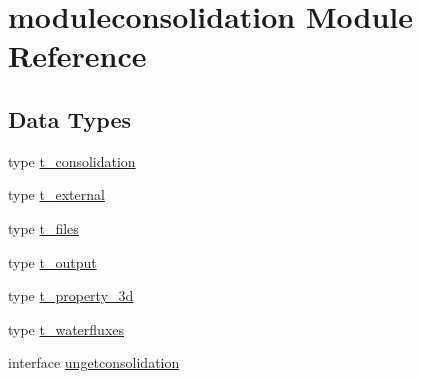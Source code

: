 \hypertarget{namespacemoduleconsolidation}{}\section{moduleconsolidation Module Reference}
\label{namespacemoduleconsolidation}
\subsection*{Data Types}
\begin{DoxyCompactItemize}
\item 
type \mbox{\hyperlink{structmoduleconsolidation_1_1t__consolidation}{t\+\_\+consolidation}}
\item 
type \mbox{\hyperlink{structmoduleconsolidation_1_1t__external}{t\+\_\+external}}
\item 
type \mbox{\hyperlink{structmoduleconsolidation_1_1t__files}{t\+\_\+files}}
\item 
type \mbox{\hyperlink{structmoduleconsolidation_1_1t__output}{t\+\_\+output}}
\item 
type \mbox{\hyperlink{structmoduleconsolidation_1_1t__property__3d}{t\+\_\+property\+\_\+3d}}
\item 
type \mbox{\hyperlink{structmoduleconsolidation_1_1t__waterfluxes}{t\+\_\+waterfluxes}}
\item 
interface \mbox{\hyperlink{interfacemoduleconsolidation_1_1ungetconsolidation}{ungetconsolidation}}
\end{DoxyCompactItemize}
